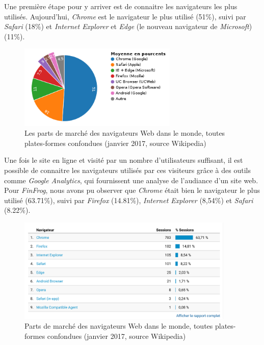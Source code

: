 \bigskip

Une première étape pour y arriver est de connaitre les navigateurs les
plus utilisés. Aujourd'hui, \emph{Chrome} est le navigateur le plus
utilisé (51\%), suivi par \emph{Safari} (18\%) et \emph{Internet
Explorer} et \emph{Edge} (le nouveau navigateur de \emph{Microsoft})
(11\%).

\begin{figure}[h]
  \centering
  \includegraphics[height=4cm]{figures/browsers.png}
  \caption{Les parts de marché des navigateurs Web dans le monde, toutes plates-formes confondues (janvier 2017, source Wikipedia)}
\end{figure}

\bigskip

Une fois le site en ligne et visité par un nombre d'utilisateurs
suffisant, il est possible de connaitre les navigateurs utilisés par ces
visiteurs grâce à des outils comme \emph{Google Analytics}, qui
fournissent une analyse de l'audiance d'un site web. Pour
\emph{FinFrog}, nous avons pu observer que \emph{Chrome} était bien le
navigateur le plus utilisé (63.71\%), suivi par \emph{Firefox}
(14.81\%), \emph{Internet Explorer} (8,54\%) et \emph{Safari} (8.22\%).

\begin{figure}[h]
  \centering
  \includegraphics[height=5cm]{figures/FF-browsers.png}
  \caption{Parts de marché des navigateurs Web dans le monde, toutes plates-formes confondues (janvier 2017, source Wikipedia)}
\end{figure}

\bigskip


